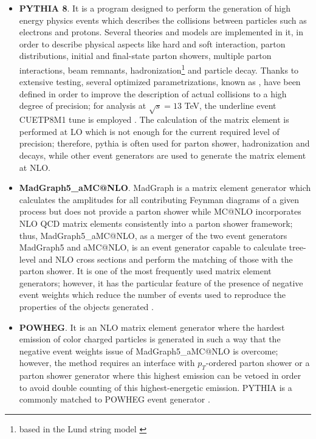 \begin{itemize}

\item \textbf{PYTHIA 8}. It is a program designed to perform the generation of high energy physics events which describes the collisions between particles such as electrons and protons. Several theories and models are implemented in it, in order to describe physical aspects like hard and soft interaction, parton distributions, initial and final-state parton showers, multiple parton interactions, beam remnants, hadronization\footnote{based in the Lund string model \cite{lund}} and particle decay. Thanks to extensive testing, several optimized parametrizations, known as , have been defined in order to improve the description of actual collisions to a high degree of precision; for analysis at $\sqrt{s}=13$ TeV, the underline event CUETP8M1 tune is employed \cite{tune}.  The calculation of the matrix element is performed at LO which is not enough for the current required level of precision; therefore, pythia is often used for parton shower, hadronization and decays, while other event generators are used to generate the matrix element at NLO.
\item \textbf{MadGraph5\_aMC@NLO}. MadGraph is a matrix element generator which calculates the amplitudes for all contributing Feynman diagrams of a given process but does not provide a parton shower while MC@NLO incorporates NLO QCD matrix elements consistently into a parton shower framework; thus, MadGraph5\_aMC@NLO, as a merger of the two event generators MadGraph5 and aMC@NLO, is an event generator capable to calculate tree-level and NLO cross sections and perform the matching of those with the parton shower. It is one of the most frequently used matrix element generators; however, it has the particular feature of the presence of negative event weights which reduce the number of events used to reproduce the properties of the objects generated \cite{madgraph}.\\
\item \textbf{POWHEG}. It is an NLO matrix element generator where the hardest emission of color charged particles is generated in such a way that the negative event weights issue of MadGraph5\_aMC@NLO is overcome; however, the method requires an interface with  $p_T$-ordered parton shower or a parton shower generator where this highest emission can be vetoed in order to avoid double counting of this highest-energetic emission. PYTHIA is a commonly matched to POWHEG event generator \cite{powheg}.
\end{itemize}

